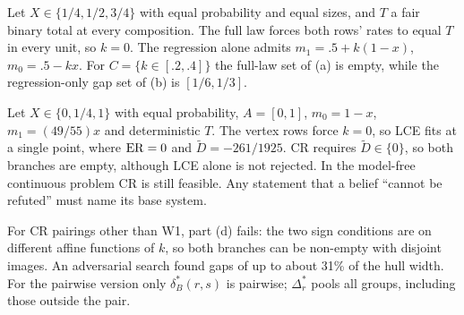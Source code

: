 \begin{remark}\label{rem:fullreg}
Let $X\in\{1/4,1/2,3/4\}$ with equal probability and equal sizes, and $T$ a fair
binary total at every composition. The full law forces both rows' rates to equal
$T$ in every unit, so $k=0$. The regression alone admits $m_1=.5+k(1-x)$,
$m_0=.5-kx$. For $C=\{k\in[.2,.4]\}$ the full-law set of (a) is empty, while the
regression-only gap set of (b) is $[1/6,1/3]$.
\end{remark}

\begin{remark}\label{rem:LCEexcludesCR}
Let $X\in\{0,1/4,1\}$ with equal probability, $A=[0,1]$, $m_0=1-x$,
$m_1=(49/55)x$ and deterministic $T$. The vertex rows force $k=0$, so LCE fits at a
single point, where $\mathrm{ER}=0$ and $\tilde D=-261/1925$. CR requires
$\tilde D\in\{0\}$, so both branches are empty, although LCE alone is not
rejected. In the model-free continuous problem CR is still feasible. Any statement
that a belief ``cannot be refuted'' must name its base system.
\end{remark}

For CR pairings other than W1, part (d) fails: the two sign conditions are on
different affine functions of $k$, so both branches can be non-empty with
disjoint images. An adversarial search found gaps of up to about 31\% of the hull
width. For the pairwise version only $\delta^*_B(r,s)$ is pairwise; $\Delta^*_r$
pools all groups, including those outside the pair.

